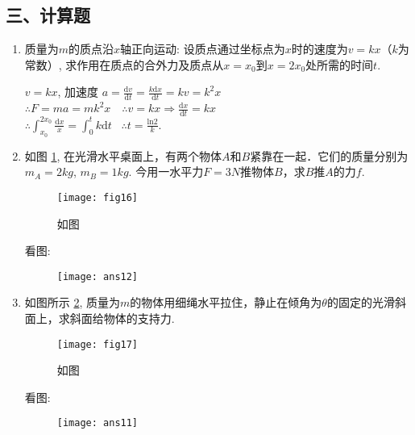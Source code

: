 \subsection*{三、计算题}
\begin{enumerate}
    \item 质量为$m$的质点沿$x$轴正向运动: 设质点通过坐标点为$x$时的速度为$v=kx$（$k$为常数）, 求作用在质点的合外力及质点从$x=x_0$到$x=2x_0$处所需的时间$t$.
    \begin{solution}
        $v = kx$, 加速度 $a = \frac{\mathrm{d}v}{\mathrm{d}t}=\frac{k\mathrm{d}x}{\mathrm{d}t}=kv=k^2x$\\
        $\therefore F = ma = mk^2x $\ \ $\therefore v = kx \Longrightarrow \frac{\mathrm{d}x}{\mathrm{d}t}=kx$\\ 
        $\therefore \displaystyle{\int_{x_0}^{2x_0}\frac{\mathrm{d}x}{x}=\int_0^t k\mathrm{d}t}$ \  $\therefore t = \frac{\mathrm{ln2}}{k}$.
    \end{solution}
    \item 如图 \ref{Fig:16}, 在光滑水平桌面上，有两个物体$A$和$B$紧靠在一起．它们的质量分别为$m_A=2kg$, $m_B=1kg$. 今用一水平力$F=3N$推物体$B$，求$B$推$A$的力$f$. 
    \begin{figure}[H]
        \centering
        \texttt{[image: fig16]}
            \caption{如图}\label{Fig:16}
    \end{figure}
    \begin{solution}
        看图: 
        \begin{figure}[H]
            \centering
            \texttt{[image: ans12]}
        \end{figure}
    \end{solution}
    \item 如图所示 \ref{Fig:17}, 质量为$m$的物体用细绳水平拉住，静止在倾角为$\theta$的固定的光滑斜面上，求斜面给物体的支持力.
    \begin{figure}[H]
        \centering
        \texttt{[image: fig17]}
            \caption{如图}\label{Fig:17}
    \end{figure}
    \begin{solution}
        看图: 
        \begin{figure}[H]
            \centering
            \texttt{[image: ans11]}
        \end{figure}
    \end{solution}


\end{enumerate}

